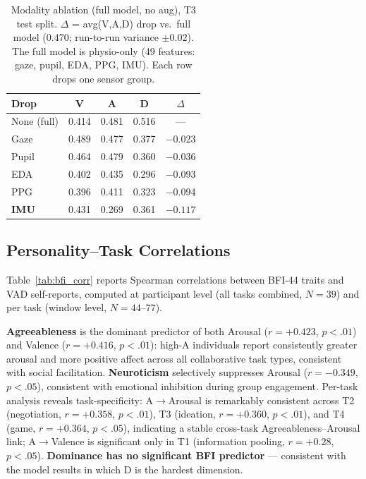 \documentclass[sigconf,nonacm]{acmart}
\begin{document}
\begin{table}[t]
\caption{Modality ablation (full model, no aug), T3 test split.
  $\Delta$ = avg(V,A,D) drop vs.\ full model ($0.470$; run-to-run variance
  $\pm 0.02$). The full model is physio-only (49 features: gaze, pupil,
  EDA, PPG, IMU). Each row drops one sensor group.}
\label{tab:ablation}
\centering
\begin{tabular}{lccc|c}
\toprule
\textbf{Drop} & \textbf{V} & \textbf{A} & \textbf{D} & $\Delta$ \\
\midrule
None (full)     & 0.414 & 0.481 & 0.516 &  ---   \\
Gaze            & 0.489 & 0.477 & 0.377 & $-$0.023 \\
Pupil           & 0.464 & 0.479 & 0.360 & $-$0.036 \\
EDA             & 0.402 & 0.435 & 0.296 & $-$0.093 \\
PPG             & 0.396 & 0.411 & 0.323 & $-$0.094 \\
\textbf{IMU}    & 0.431 & 0.269 & 0.361 & $\mathbf{-0.117}$ \\
\bottomrule
\end{tabular}
\end{table}

\subsection{Personality--Task Correlations}

Table~\ref{tab:bfi_corr} reports Spearman correlations between BFI-44 traits
and VAD self-reports, computed at participant level (all tasks combined,
$N = 39$) and per task (window level, $N = 44$--$77$).

\textbf{Agreeableness} is the dominant predictor of both Arousal
($r = {+}0.423$, $p < .01$) and Valence ($r = {+}0.416$, $p < .01$):
high-A individuals report consistently greater arousal and more positive
affect across all collaborative task types, consistent with social
facilitation.
\textbf{Neuroticism} selectively suppresses Arousal ($r = {-}0.349$,
$p < .05$), consistent with emotional inhibition during group engagement.
Per-task analysis reveals task-specificity: A$\to$Arousal is remarkably
consistent across T2 (negotiation, $r = {+}0.358$, $p{<}.01$),
T3 (ideation, $r = {+}0.360$, $p{<}.01$), and T4 (game, $r = {+}0.364$,
$p{<}.05$), indicating a stable cross-task Agreeableness--Arousal link;
A$\to$Valence is significant only in T1 (information pooling, $r = {+}0.28$,
$p{<}.05$).
\textbf{Dominance has no significant BFI predictor} --- consistent with
the model results in which D is the hardest dimension.
\end{document}
